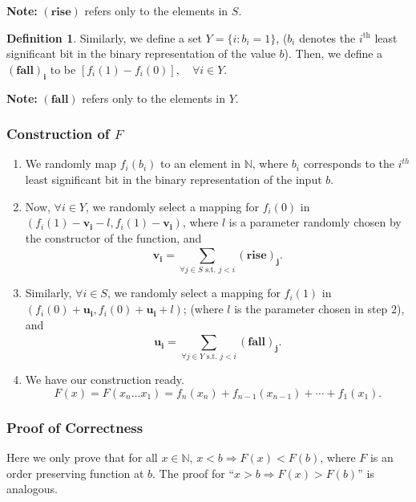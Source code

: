 \documentclass[11pt, letterpaper, romanappendices, onecolumn]{article}
\theoremstyle{plain}\newtheorem{thm}{Theorem}[section]
\theoremstyle{definition}
\newtheorem{defn}{Definition}[section]
\theoremstyle{remark}
\begin{document}
\par \textbf{Note:} $\mathbf{(rise)}$ refers only to the elements in $S$.
 
\begin{defn}\label{definefall}
Similarly, we define a set $Y = \lbrace i:b_i =1 \rbrace$, ($b_i$ denotes the $i^\text{th}$ least significant bit in the binary representation of the value  $b$). Then, we define a $\mathbf{(fall)_i}$ to be $[f_i (1) -f_i(0)], \quad \forall i \in Y$.
\end{defn}

\par \textbf{Note:} $\mathbf{(fall)}$ refers only to the elements in $Y$.

\subsubsection{Construction of $F$}\label{ConsC}
\begin{enumerate}
	\item We randomly map $f_i (b_i)$ to an element in $\mathbb{N}$, where $b_i$ corresponds to the $i^{th}$ least significant bit in the binary representation of the input $b$.
	\item Now, $\forall i \in Y$, we randomly select a mapping for $f_i (0)$ in $(f_i (1) - \mathbf{v_i} - l, f_i (1)-\mathbf{v_i})$, where $l$ is a parameter randomly chosen by the constructor of the function, and
	\[
		\mathbf{v_i} = \sum\limits^{}_{\forall j \in S \text{ s.t. } j < i} \mathbf{(rise)_j}. \label{eqn rise}
	\]
	\item Similarly, $\forall i \in S$, we randomly select a mapping for $f_i (1)$ in $(f_i (0) + \mathbf{u_i}, f_i(0)+ \mathbf{u_i} + l)$; (where $l$ is the parameter chosen in step 2), and
	\[
		\mathbf{u_i} = \sum\limits^{}_{\forall j \in Y \text{ s.t. } j < i} \mathbf{(fall)_j}.
	\]
	\item We have our construction ready.
	\[
		F(x) = F(x_n\ldots x_1)=f_n (x_n) + f_{n-1} (x_{n-1}) + \cdots + f_1(x_1).
	\]
\end{enumerate}

\subsubsection{Proof of Correctness}
\par Here we only prove that for all $x\in \mathbb{N}$, $x < b\Longrightarrow F(x) < F(b)$, where $F$ is an order preserving function at $b$. The proof for ``$x > b \Rightarrow F(x) > F(b)$'' is analogous.
\end{document}
